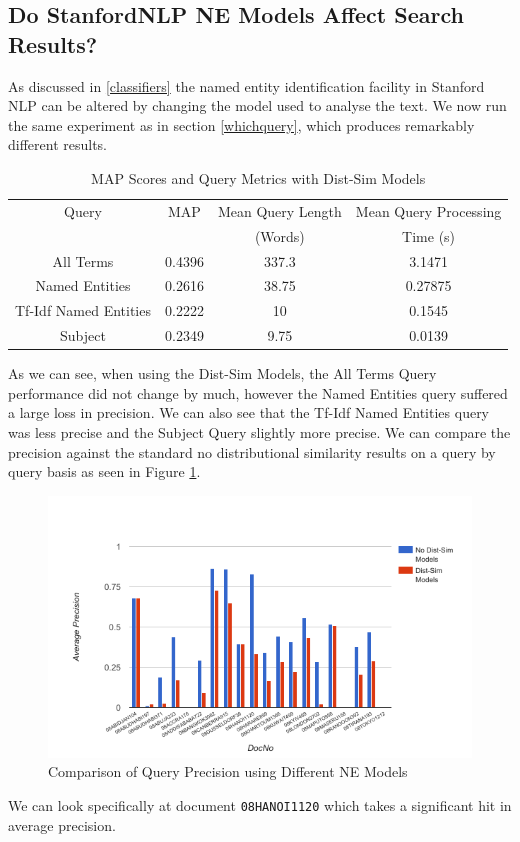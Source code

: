 \documentclass{l4proj}
\newcommand{\code}[1]{\texttt{#1}}
\begin{document}
\subsection{Do StanfordNLP NE Models Affect Search Results?} \label{distsim}
As discussed in \ref{classifiers} the named entity identification facility in Stanford NLP can be altered by changing the model used to analyse the text. We now run the same experiment as in section \ref{whichquery}, which produces remarkably different results.
\begin{center}
\begin{table}[h]
\centering
\begin{tabular}{|c|c|c|c|}
\hline
Query                 & MAP    & Mean Query Length & Mean Query Processing \\ 
& & (Words) & Time (s) \\\hline
All Terms             & 0.4396 & 337.3             & 3.1471                       \\ \hline
Named Entities        & 0.2616 & 38.75             & 0.27875                         \\ \hline
Tf-Idf Named Entities & 0.2222 & 10                & 0.1545                       \\ \hline
Subject               & 0.2349 & 9.75              & 0.0139                        \\ \hline
\end{tabular}
\caption{MAP Scores and Query Metrics with Dist-Sim Models}
\label{results}
\end{table}
\end{center}
As we can see, when using the Dist-Sim Models, the All Terms Query performance did not change by much, however the Named Entities query suffered a large loss in precision. We can also see that the Tf-Idf Named Entities query was less precise and the Subject Query slightly more precise.
We can compare the precision against the standard no distributional similarity results on a query by query basis as seen in Figure \ref{query_by_query}.
\begin{figure}[H]
\centering
\includegraphics[scale=0.60]{images/query_by_query}
\caption{Comparison of Query Precision using Different NE Models}
\label{query_by_query}
\end{figure}
We can look specifically at document \code{08HANOI1120} which takes a significant hit in average precision.
\end{document}
